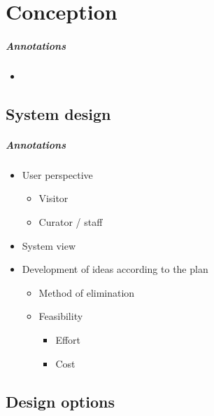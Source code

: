 \chapter{Conception}
\label{conception}

\paragraph{Annotations}

\begin{itemize}
	\item 
\end{itemize}


\section{System design}
\label{conception_system}

\paragraph{Annotations}

\begin{itemize}
	\item User perspective
	\begin{itemize}
		\item Visitor
		\item Curator / staff
	\end{itemize}
	\item System view
	\\
	\item Development of ideas according to the plan
	\begin{itemize}
		\item Method of elimination
		\item Feasibility
		\begin{itemize}
			\item Effort
			\item Cost
		\end{itemize}
	\end{itemize}
\end{itemize}


\section{Design options}
\label{conception_design}

